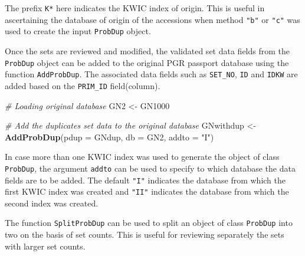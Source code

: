 \documentclass[]{article}
\newenvironment{Shaded}{\begin{snugshade}}{\end{snugshade}}
\newcommand{\CommentTok}[1]{\textcolor[rgb]{0.56,0.35,0.01}{\textit{#1}}}
\newcommand{\DataTypeTok}[1]{\textcolor[rgb]{0.13,0.29,0.53}{#1}}
\newcommand{\KeywordTok}[1]{\textcolor[rgb]{0.13,0.29,0.53}{\textbf{#1}}}
\newcommand{\NormalTok}[1]{#1}
\newcommand{\StringTok}[1]{\textcolor[rgb]{0.31,0.60,0.02}{#1}}
\begin{document}
The prefix \texttt{K*} here indicates the KWIC index of origin. This is
useful in ascertaining the database of origin of the accessions when
method \texttt{"b"} or \texttt{"c"} was used to create the input
\texttt{ProbDup} object.

Once the sets are reviewed and modified, the validated set data fields
from the \texttt{ProbDup} object can be added to the original PGR
passport database using the function \texttt{AddProbDup}. The associated
data fields such as \texttt{SET\_NO}, \texttt{ID} and \texttt{IDKW} are
added based on the \texttt{PRIM\_ID} field(column).

\begin{Shaded}
\begin{Highlighting}[]
\CommentTok{# Loading original database}
\NormalTok{GN2 <-}\StringTok{ }\NormalTok{GN1000}

\CommentTok{# Add the duplicates set data to the original database}
\NormalTok{GNwithdup <-}\StringTok{  }\KeywordTok{AddProbDup}\NormalTok{(}\DataTypeTok{pdup =}\NormalTok{ GNdup, }\DataTypeTok{db =}\NormalTok{ GN2, }\DataTypeTok{addto =} \StringTok{"I"}\NormalTok{)}
\end{Highlighting}
\end{Shaded}

In case more than one KWIC index was used to generate the object of
class \texttt{ProbDup}, the argument \texttt{addto} can be used to
specify to which database the data fields are to be added. The default
\texttt{"I"} indicates the database from which the first KWIC index was
created and \texttt{"II"} indicates the database from which the second
index was created.

The function \texttt{SplitProbDup} can be used to split an object of
class \texttt{ProbDup} into two on the basis of set counts. This is
useful for reviewing separately the sets with larger set counts.
\end{document}
